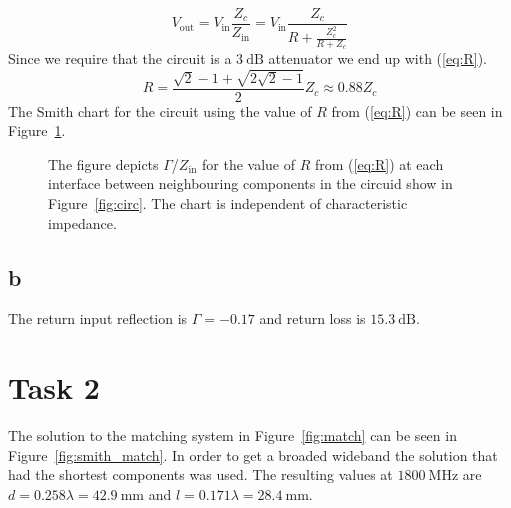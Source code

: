 \documentclass{article}
\begin{document}
\begin{equation}
  V_\text{out} = V_\text{in}\dfrac{Z_c}{Z_\text{in}}=V_\text{in}\dfrac{Z_c}{R+\frac{Z_c^2}{R+Z_c}}
  \label{eq:voltdiv}
\end{equation}
Since we require that the circuit is a $\SI{3}{\deci\bel}$ attenuator we end up with (\ref{eq:R}).
\begin{equation}
  R=\dfrac{\sqrt{2}-1+\sqrt{2\sqrt{2}-1}}{2}Z_c\approx 0.88Z_c
  \label{eq:R}
\end{equation}
The Smith chart for the circuit using the value of $R$ from (\ref{eq:R}) can be seen in Figure~\ref{fig:smithr}.
\begin{figure}
  \centering
  \noindent{}
  \caption{The figure depicts $\Gamma$/$Z_\text{in}$ for the value of $R$ from (\ref{eq:R}) at each interface between neighbouring components in the circuid show in Figure~\ref{fig:circ}. The chart is independent of characteristic impedance.}
  \label{fig:smithr}
\end{figure}
\subsection{b}\label{sec:1b}
The return input reflection is $\Gamma=-0.17$ and return loss is $\SI{15.3}{\deci\bel}$.

\section{Task 2}\label{sec:2}
The solution to the matching system in Figure~\ref{fig:match} can be seen in Figure~\ref{fig:smith_match}. In order to get a broaded wideband the solution that had the shortest components was used. The resulting values at $\SI{1800}{\mega\hertz}$ are $d=0.258\lambda=\SI{42.9}{\milli\metre}$ and $l=0.171\lambda=\SI{28.4}{\milli\metre}$.
\end{document}
